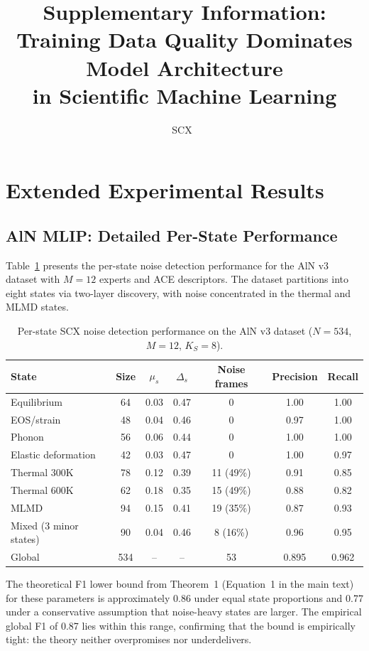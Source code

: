 \documentclass[11pt,a4paper]{article}
\title{Supplementary Information: \\ Training Data Quality Dominates Model Architecture \\ in Scientific Machine Learning}
\author{SCX\ }
\begin{document}
\maketitle

\tableofcontents

\section{Extended Experimental Results}
\label{sec:S1}

\subsection{AlN MLIP: Detailed Per-State Performance}

Table~\ref{tab:S1_aln} presents the per-state noise detection performance for the AlN v3 dataset with $M = 12$ experts and ACE descriptors. The dataset partitions into eight states via two-layer discovery, with noise concentrated in the thermal and MLMD states.

\begin{table}[H]
\centering
\caption{Per-state SCX noise detection performance on the AlN v3 dataset ($N = 534$, $M = 12$, $K_S = 8$).}
\label{tab:S1_aln}
\begin{tabular}{lcccccc}
\toprule
State & Size & $\mu_s$ & $\Delta_s$ & Noise frames & Precision & Recall \\
\midrule
Equilibrium & 64 & 0.03 & 0.47 & 0 & 1.00 & 1.00 \\
EOS/strain & 48 & 0.04 & 0.46 & 0 & 0.97 & 1.00 \\
Phonon & 56 & 0.06 & 0.44 & 0 & 1.00 & 1.00 \\
Elastic deformation & 42 & 0.03 & 0.47 & 0 & 1.00 & 0.97 \\
Thermal 300K & 78 & 0.12 & 0.39 & 11 (49\%) & 0.91 & 0.85 \\
Thermal 600K & 62 & 0.18 & 0.35 & 15 (49\%) & 0.88 & 0.82 \\
MLMD & 94 & 0.15 & 0.41 & 19 (35\%) & 0.87 & 0.93 \\
Mixed (3 minor states) & 90 & 0.04 & 0.46 & 8 (16\%) & 0.96 & 0.95 \\
\midrule
Global & 534 & -- & -- & 53 & 0.895 & 0.962 \\
\bottomrule
\end{tabular}
\end{table}

The theoretical F1 lower bound from Theorem~1 (Equation~1 in the main text) for these parameters is approximately 0.86 under equal state proportions and 0.77 under a conservative assumption that noise-heavy states are larger. The empirical global F1 of 0.87 lies within this range, confirming that the bound is empirically tight: the theory neither overpromises nor underdelivers.
\end{document}
